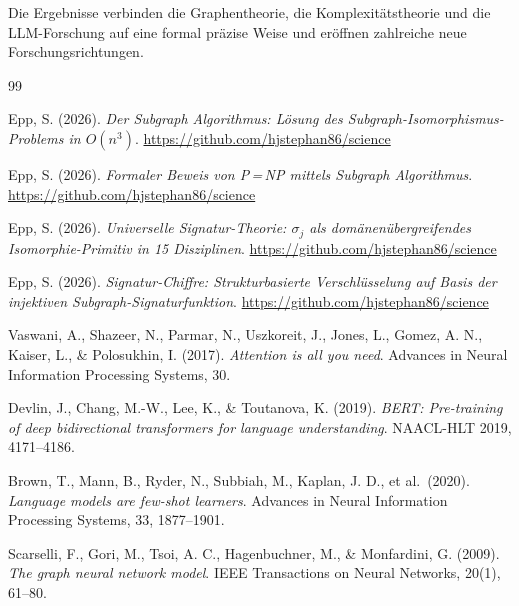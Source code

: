 ﻿\documentclass[a4paper,12pt]{article}
\theoremstyle{definition}
\begin{document}
Die Ergebnisse verbinden die Graphentheorie, die Komplexitätstheorie und
die LLM-Forschung auf eine formal präzise Weise und eröffnen zahlreiche
neue Forschungsrichtungen.

\begin{thebibliography}{99}

Epp, S. (2026).
\textit{Der Subgraph Algorithmus: Lösung des Subgraph-Isomorphismus-Problems
in $O(n^3)$}.
\url{https://github.com/hjstephan86/science}

Epp, S. (2026).
\textit{Formaler Beweis von P\,=\,NP mittels Subgraph Algorithmus}.
\url{https://github.com/hjstephan86/science}

Epp, S. (2026).
\textit{Universelle Signatur-Theorie: $\sigma_j$ als domänenübergreifendes
Isomorphie-Primitiv in 15 Disziplinen}.
\url{https://github.com/hjstephan86/science}

Epp, S. (2026).
\textit{Signatur-Chiffre: Strukturbasierte Verschlüsselung auf Basis
der injektiven Subgraph-Signaturfunktion}.
\url{https://github.com/hjstephan86/science}

Vaswani, A., Shazeer, N., Parmar, N., Uszkoreit, J., Jones, L.,
Gomez, A. N., Kaiser, L., \& Polosukhin, I. (2017).
\textit{Attention is all you need}.
Advances in Neural Information Processing Systems, 30.

Devlin, J., Chang, M.-W., Lee, K., \& Toutanova, K. (2019).
\textit{BERT: Pre-training of deep bidirectional transformers for
language understanding}.
NAACL-HLT 2019, 4171--4186.

Brown, T., Mann, B., Ryder, N., Subbiah, M., Kaplan, J. D., et al.\ (2020).
\textit{Language models are few-shot learners}.
Advances in Neural Information Processing Systems, 33, 1877--1901.

Scarselli, F., Gori, M., Tsoi, A. C., Hagenbuchner, M., \& Monfardini, G.
(2009).
\textit{The graph neural network model}.
IEEE Transactions on Neural Networks, 20(1), 61--80.


\end{thebibliography}
\end{document}
